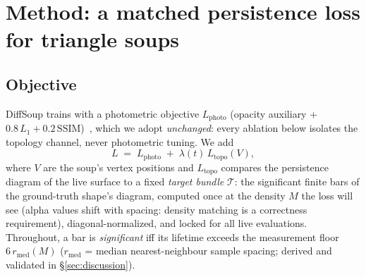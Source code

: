 \section{Method: a matched persistence loss for \mbox{triangle} soups}
\label{sec:method}


\subsection{Objective}
DiffSoup trains with a photometric objective $L_{\mathrm{photo}}$ (opacity
auxiliary + $0.8\,L_1 + 0.2\,\mathrm{SSIM}$)~\citep{tojo2026diffsoup}, which
we adopt \emph{unchanged}: every ablation below isolates the topology
channel, never photometric tuning. We add
\begin{equation}
L \;=\; L_{\mathrm{photo}} \;+\; \lambda(t)\, L_{\mathrm{topo}}(V),
\end{equation}
where $V$ are the soup's vertex positions and $L_{\mathrm{topo}}$ compares the
persistence diagram of the live surface to a fixed \emph{target bundle}
$\mathcal{T}$: the significant finite bars of the ground-truth shape's
diagram, computed once at the density $M$ the loss will see
(alpha values shift with spacing: density matching is a correctness
requirement), diagonal-normalized, and locked for all live evaluations.
Throughout, a bar is \emph{significant} iff its lifetime exceeds the
measurement floor $6\,r_{\mathrm{med}}(M)$ ($r_{\mathrm{med}}$ = median
nearest-neighbour sample spacing; derived and validated in
\S\ref{sec:discussion}).

